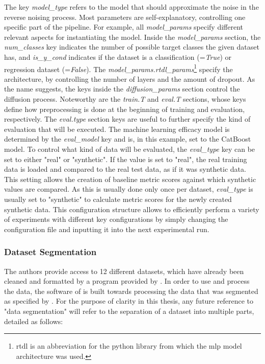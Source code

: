 The key \textit{model\_type} refers to the model that should approximate the noise in the reverse noising process.
Most parameters are self-explanatory, controlling one specific part of the pipeline.
For example, all \textit{model\_params} specify different relevant aspects for instantiating the model.
Inside the \textit{model\_params} section, the \textit{num\_classes} key indicates the number of possible target classes the given dataset has, and \textit{is\_y\_cond} indicates if the dataset is a classification (=\textit{True}) or regression dataset (=\textit{False}).
The \textit{model\_params.rtdl\_params}\footnote{rtdl is an abbreviation for the python library \cite{gorishniy2021RevisitingDeepLearning} from which the \gls{mlp} model architecture was used.} specify the  architecture, by controlling the number of layers and the amount of dropout.
As the name suggests, the keys inside the \textit{diffusion\_params} section control the diffusion process.
Noteworthy are the \textit{train.T} and \textit{eval.T} sections, whose keys define how preprocessing is done at the beginning of training and evaluation, respectively.
The \textit{eval.type} section keys are useful to further specify the kind of evaluation that will be executed.
The machine learning efficacy model is determined by the \textit{eval\_model} key and is, in this example, set to the CatBoost model.
To control what kind of data will be evaluated, the \textit{eval\_type} key can be set to either "real" or "synthetic".
If the value is set to "real", the real training data is loaded and compared to the real test data, as if it was synthetic data.
This setting allows the creation of baseline metric scores against which synthetic values are compared.
As this is usually done only once per dataset, \textit{eval\_type} is usually set to "synthetic" to calculate metric scores for the newly created synthetic data.
This configuration structure allows to efficiently perform a variety of experiments with different key configurations by simply changing the configuration file and inputting it into the next experimental run.

\subsubsection[]{Dataset Segmentation}
\label{sec:data_format}
The authors provide access to 12 different datasets, which have already been cleaned and formatted by a program provided by \textcite{gorishniy2023EmbeddingsNumericalFeatures}.
In order to use and process the data, the software of \cite{kotelnikov2022TabDDPMModellingTabular} is built towards processing the data that was segmented as specified by \textcite{gorishniy2023EmbeddingsNumericalFeatures}.
For the purpose of clarity in this thesis, any future reference to "data segmentation" will refer to the separation of a dataset into multiple parts, detailed as follows:

